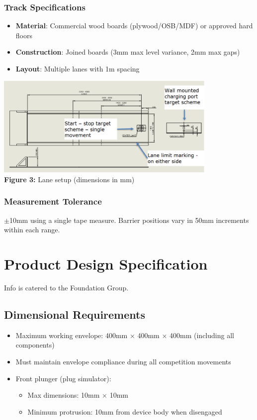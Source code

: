 \documentclass{article}
\begin{document}
\subsubsection*{Track Specifications}
\begin{itemize}[noitemsep,topsep=0pt]
	\item \textbf{Material}: Commercial wood boards (plywood/OSB/MDF) or approved hard floors
	\item \textbf{Construction}: Joined boards (3mm max level variance, 2mm max gaps)
	\item \textbf{Layout}: Multiple lanes with 1m spacing
\end{itemize}
\begin{center}
	\includegraphics[width=0.8\textwidth]{extracted_images/image_4_2.png}\\
	\small\textbf{Figure 3:} Lane setup (dimensions in mm)
\end{center}
\subsubsection*{Measurement Tolerance}
$\pm$10mm using a single tape measure. Barrier positions vary in 50mm increments within each range.


\section{Product Design Specification}
Info is catered to the Foundation Group.
\subsection{Dimensional Requirements}
\begin{itemize}[itemsep=-0.7mm]
	\item Maximum working envelope: 400mm $\times$ 400mm $\times$ 400mm (including all components)
	\item Must maintain envelope compliance during all competition movements
	\item Front plunger (plug simulator):
	\begin{itemize}[noitemsep,topsep=0pt]
		\item Max dimensions: 10mm $\times$ 10mm
		\item Minimum protrusion: 10mm from device body when disengaged
	\end{itemize}
\end{itemize}
\end{document}
